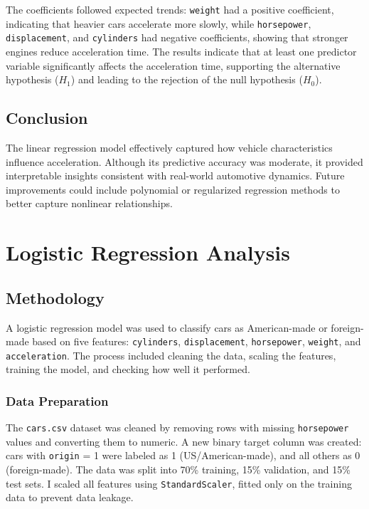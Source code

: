 \documentclass[a4paper, twocolumn]{article}
\begin{document}
The coefficients followed expected trends: \texttt{weight} had a positive coefficient, indicating that heavier cars accelerate more slowly, while \texttt{horsepower}, \texttt{displacement}, and \texttt{cylinders} had negative coefficients, showing that stronger engines reduce acceleration time. The results indicate that at least one predictor variable significantly affects the acceleration time, supporting the alternative hypothesis ($H_1$) and leading to the rejection of the null hypothesis ($H_0$).


\subsection{Conclusion}
The linear regression model effectively captured how vehicle characteristics influence acceleration. Although its predictive accuracy was moderate, it provided interpretable insights consistent with real-world automotive dynamics. Future improvements could include polynomial or regularized regression methods to better capture nonlinear relationships.


\section{Logistic Regression Analysis}

\subsection{Methodology}
A logistic regression model was used to classify cars as American-made or foreign-made based on five features: \texttt{cylinders}, \texttt{displacement}, \texttt{horsepower}, \texttt{weight}, and \texttt{acceleration}. The process included cleaning the data, scaling the features, training the model, and checking how well it performed.

\subsubsection{Data Preparation}
The \texttt{cars.csv} dataset was cleaned by removing rows with missing \texttt{horsepower} values and converting them to numeric. A new binary target column was created: cars with \texttt{origin} = 1 were labeled as 1 (US/American-made), and all others as 0 (foreign-made). The data was split into 70\% training, 15\% validation, and 15\% test sets. I scaled all features using \texttt{StandardScaler}, fitted only on the training data to prevent data leakage.
\end{document}

